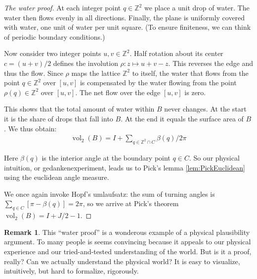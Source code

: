 \documentclass[a4paper]{amsart}
\numberwithin{equation}{section}
\theoremstyle{plain}
\theoremstyle{definition}
\newtheorem{remark}[theorem]{Remark}
\newcommand{\Z}{\mathbb{Z}}
\DeclareMathOperator{\vol}{vol}
\begin{document}
\begin{proof}[The water proof]
  At each integer point $q \in \Z^2$ we place a unit drop of water.
  The water then flows evenly in all directions.  Finally, the plane is
  uniformly covered with water, one unit of water per unit square.
  (To ensure finiteness, we can think of periodic boundary conditions.)

  Now consider two integer points $u,v \in \Z^2$.
  Half rotation about its center $c = (u+v)/2$
  defines the involution $\rho \colon z \mapsto u + v - z$.
  This reverses the edge and thus the flow.
  Since $\rho$ maps the lattice $\Z^2$ to itself,
  the water that flows from the point $q \in \Z^2$ over $[u,v]$ 
  is compensated by the water flowing from the point $\rho(q) \in \Z^2$ over $[u,v]$.
  The net flow over the edge $[u,v]$ is zero.
  
  This shows that the total amount of water within $B$ never changes.
  At the start it is the share of drops that fall into $B$.
  At the end it equals the surface area of $B$.
  We thus obtain:
  \begin{align*}
    \vol_2(B) = I + \sum_{q \in \Z^2 \cap C} \beta(q) / 2\pi
  \end{align*}

  Here $\beta(q)$ is the interior angle at the boundary point $q \in C$.
  So our physical intuition, or gedankenexperiment, leads us to
  Pick's lemma \ref{lem:PickEuclidean} using the euclidean angle measure.

  We once again invoke Hopf's umlaufsatz:
  the sum of turning angles is $\sum_{q \in C} [ \pi - \beta(q) ] = 2\pi$,
  so we arrive at Pick's theorem $\vol_2(B) = I + J/2 - 1$.
\end{proof}



\begin{remark}
  This “water proof” is a wonderous example
  of a physical plausibility argument.
  To many people is seems convincing
  because it appeals to our physical experience
  and our tried-and-tested understanding of the world.
  But is it a proof, really?
  Can we actually understand the physical world?
  It is easy to visualize, intuitively, but hard to formalize, rigorously.
\end{remark}
\end{document}
